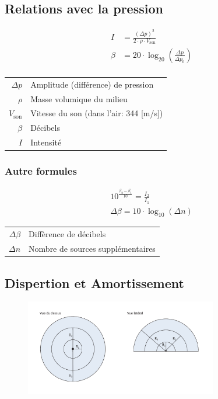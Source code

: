 \documentclass[12pt,a4paper]{article} %
\begin{document}
\subsection{Relations avec la pression}
\begin{twocols}
		\begin{align*}
		I &= \frac{(\Delta p)^2}{2 \cdot \rho \cdot V_\text{son}} \\
		\beta &= 20 \cdot \log_{20}\left(\frac{\Delta p}{\Delta p_0}\right) \\
	\end{align*}
\nextcol
	\begin{tabular}{rl}
		$\Delta p$ & Amplitude (différence) de pression \\
		$\rho$ & Masse volumique du milieu \\
		$V_\text{son}$ & Vitesse du son (dans l'air: 344 [m/s]) \\
		$\beta$ & Décibels \\
		$I$ & Intensité \\
	\end{tabular}
\end{twocols}

\subsubsection*{Autre formules}
\begin{twocols}
	\begin{align*}
		10^{\frac{\displaystyle \beta_2-\beta_1}{10}}=\frac{I_2}{I_1} \\
		\Delta\beta = 10 \cdot \log_{10}(\Delta n)
	\end{align*}
\nextcol
	\begin{tabular}{rl}
		$\Delta\beta$ & Diffèrence de décibels \\
		$\Delta n$ & Nombre de sources supplémentaires \\
	\end{tabular}
\end{twocols}

\subsection{Dispertion et Amortissement}
\begin{figure}[h]
	\centering
	\includegraphics[width=0.75\textwidth]{Sonique-Dispersion}
\end{figure}
\end{document}
